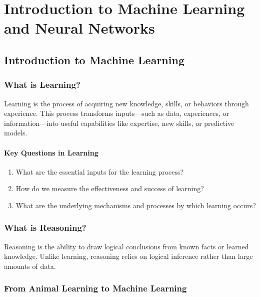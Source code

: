 \chapter{Introduction to Machine Learning and Neural Networks}
\label{chap:intro-ml-nn}

\setcounter{secnumdepth}{4}
\setcounter{tocdepth}{3}

\section{Introduction to Machine Learning}
\label{sec:intro-ml}

\subsection{What is Learning?}
\label{subsec:what-is-learning}

Learning is the process of acquiring new knowledge, skills, or behaviors through experience. This process transforms inputs—such as data, experiences, or information—into useful capabilities like expertise, new skills, or predictive models.

\subsubsection{Key Questions in Learning}
\label{subsubsec:key-questions-learning}

\begin{enumerate}
\item What are the essential inputs for the learning process?
\item How do we measure the effectiveness and success of learning?
\item What are the underlying mechanisms and processes by which learning occurs?
\end{enumerate}

\subsection{What is Reasoning?}
\label{subsec:what-is-reasoning}

Reasoning is the ability to draw logical conclusions from known facts or learned knowledge. Unlike learning, reasoning relies on logical inference rather than large amounts of data.

\subsection{From Animal Learning to Machine Learning}
\label{subsec:animal-to-ml}


